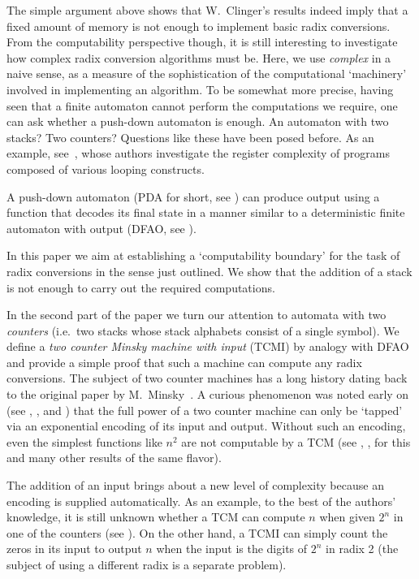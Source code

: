 \documentclass[12pt]{article}
\begin{document}
The simple argument above shows that W.~Clinger's results indeed imply
that a fixed amount of memory is not enough to implement basic radix
conversions. From the computability perspective
though, it is still interesting to investigate how complex radix
conversion algorithms must be. Here, we use {\it complex\/} in a naive
sense, as a measure of the sophistication of the computational
`machinery' involved in implementing an algorithm. To be somewhat more
precise, having seen that a finite automaton cannot perform the
computations we require, one can ask whether a push-down automaton is
enough. An automaton with two stacks? Two counters? Questions like
these have been posed before. As an example, see~\cite{holkutr}, whose authors
investigate the register complexity of programs composed of various
looping constructs.
 
A push-down automaton (PDA for short, see \cite{hum}) can produce output
using a function that decodes its final state
in a manner similar to a deterministic finite automaton with output (DFAO,
see \cite{Allouche}).

In this paper we aim at establishing a `computability boundary' for
the task of radix conversions in the sense just outlined. We show that
the addition of a stack is not enough to carry out the required
computations.

In the second part of the paper we turn our attention to automata with
two {\it counters\/} (i.e.~two stacks whose stack alphabets consist of
a single symbol). We define a {\it two counter Minsky machine with
  input\/} (TCMI) by analogy with DFAO and provide a simple proof that such a
machine can compute any radix conversions. The subject of two counter
machines has a long history dating back to the original paper by
M.~Minsky~\cite{Minsky}. A curious phenomenon was noted early on (see
\cite{Schroep}, \cite{Bardz}, and \cite{ibarra}) that the full power of
a two counter machine can only be `tapped' via an exponential encoding
of its input and output. Without such an encoding, even the simplest
functions like $n^2$ are not computable by a TCM (see \cite{Schroep},
\cite{Bardz}, \cite{ibarra} for this and many other results of the same
flavor).

The addition of an input brings about a new level of complexity
because an encoding is supplied automatically. As an
example, to the best of the authors' knowledge, it is still unknown
whether a TCM can compute $n$ when given $2^n$ in one of the counters
(see \cite{Schroep}). On the other hand, a TCMI can simply count the
zeros in its input to output $n$ when the input is the digits of
$2^n$ in radix 2 (the subject of using a different radix is a separate
problem). 
\end{document}
